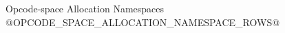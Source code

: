\begin{manuallistedformatdiagram}{Opcode-space Allocation Namespaces}
@OPCODE_SPACE_ALLOCATION_NAMESPACE_ROWS@
\end{manuallistedformatdiagram}
